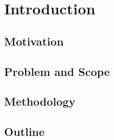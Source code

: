 \chapter{Introduction}\label{chp:introduction} 

\section{Motivation}


\section{Problem and Scope}


\section{Methodology}


\section{Outline}

